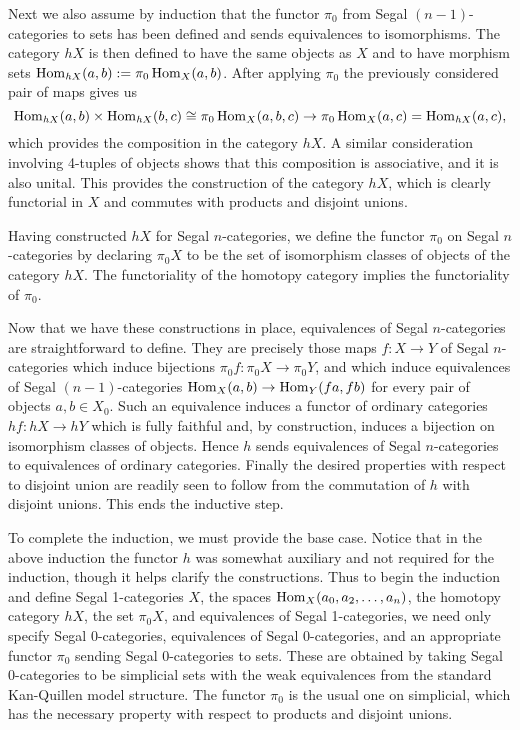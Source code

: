 \documentclass[a4paper]{amsart}
\begin{document}
Next we also assume by induction that the functor $\pi_0$ from Segal $(n-1)$-categories to sets has been defined and sends equivalences to isomorphisms. The category $\mathit{h}X$ is then defined to have the same objects as $X$ and to have morphism sets $\operatorname{Hom}_{\mathit{h}X}(a,b) := \pi_0 \operatorname{Hom}_X(a,b)$. After applying $\pi_0$ the previously considered pair of maps gives us
\begin{equation*}
	 \operatorname{Hom}_{\mathit{h}X}(a,b) \times \operatorname{Hom}_{\mathit{h}X}(b,c) \cong \pi_0 \operatorname{Hom}_X(a,b,c)\to \pi_0 \operatorname{Hom}_X(a,c) = \operatorname{Hom}_{\mathit{h}X}(a,c),
\end{equation*}
which provides the composition in the category $\mathit{h}X$. A similar consideration involving 4-tuples of objects shows that this composition is associative, and it is also unital.  
This provides the construction of the category $\mathit{h}X$, which is clearly functorial in $X$ and commutes with products and  disjoint unions.  

Having constructed $\mathit{h}X$ for Segal $n$-categories, we define the functor $\pi_0$ on Segal $n$-categories by declaring $\pi_0 X$ to be the set of isomorphism classes of objects of the category $\mathit{h}X$. The functoriality of the homotopy category implies the functoriality of $\pi_0$. 

Now that we have these constructions in place, equivalences of Segal $n$-categories are straightforward to define. They are precisely those maps $f:X \to Y$ of Segal $n$-categories which induce bijections $\pi_0 f: \pi_0 X \to \pi_0 Y$, 
and which induce equivalences of Segal $(n-1)$-categories $\operatorname{Hom}_X(a,b) \to \operatorname{Hom}_Y(fa, fb)$ for every pair of objects $a,b \in X_0$. Such an equivalence induces a functor of ordinary categories $\mathit{h}f:\mathit{h}X \to \mathit{h}Y$ which is fully faithful and, by construction, induces a bijection on isomorphism classes of objects. Hence $\mathit{h}$ sends equivalences of Segal $n$-categories to equivalences of ordinary categories. Finally the desired properties with respect to disjoint union are readily seen to follow from the commutation of $\mathit{h}$ with disjoint unions. This ends the inductive step. 

To complete the induction, we must provide the base case. Notice that in the above induction the functor $\mathit{h}$ was somewhat auxiliary and not required for the induction, though it helps clarify the constructions. Thus to begin the induction and define Segal 1-categories $X$, the spaces $\operatorname{Hom}_X(a_0, a_2, \dots, a_n)$, the homotopy category $\mathit{h}X$, the set $\pi_0X$, and equivalences of Segal 1-categories, we need only specify Segal $0$-categories, equivalences of Segal $0$-categories, and an appropriate functor $\pi_0$ sending Segal $0$-categories to sets. These are obtained by taking Segal $0$-categories to be simplicial sets with the weak equivalences from the standard Kan-Quillen model structure. The functor $\pi_0$ is the usual one on simplicial, which has the necessary property with respect to products and disjoint unions. 
\end{document}

